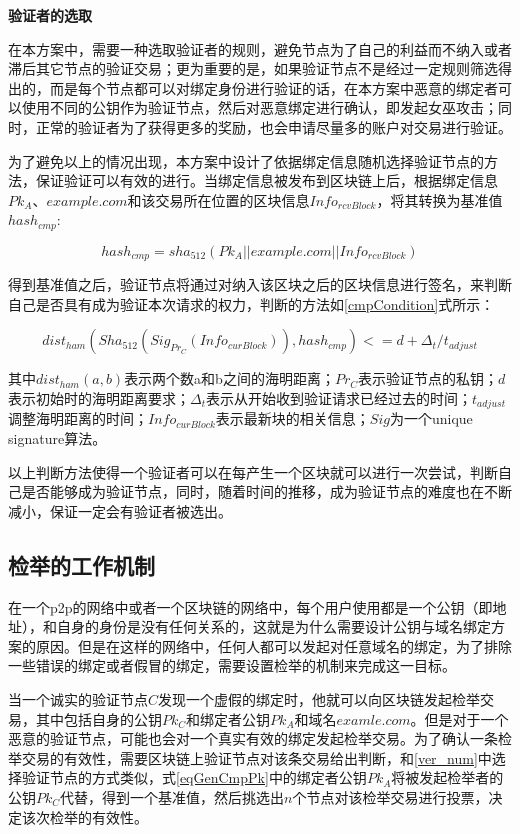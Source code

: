\noindent\textbf{验证者的选取}

在本方案中，需要一种选取验证者的规则，避免节点为了自己的利益而不纳入或者滞后其它节点的验证交易；更为重要的是，如果验证节点不是经过一定规则筛选得出的，而是每个节点都可以对绑定身份进行验证的话，在本方案中恶意的绑定者可以使用不同的公钥作为验证节点，然后对恶意绑定进行确认，即发起女巫攻击；同时，正常的验证者为了获得更多的奖励，也会申请尽量多的账户对交易进行验证。

为了避免以上的情况出现，本方案中设计了依据绑定信息随机选择验证节点的方法，保证验证可以有效的进行。当绑定信息被发布到区块链上后，根据绑定信息$Pk_A$、$example.com$和该交易所在位置的区块信息$Info_{rcvBlock}$，将其转换为基准值$hash_{cmp}$:

\begin{equation}\label{eqGenCmpPk}
hash_{cmp} = sha_{512}(Pk_A||example.com||Info_{rcvBlock})
\end{equation}

得到基准值之后，验证节点将通过对纳入该区块之后的区块信息进行签名，来判断自己是否具有成为验证本次请求的权力，判断的方法如\ref{cmpCondition}式所示：


\begin{equation}\label{cmpCondition}
dist_{ham}(Sha_{512}(Sig_{Pr_C}(Info_{curBlock})), hash_{cmp}) <= d + \Delta_t / t_{adjust}
\end{equation}

其中$dist_{ham}(a,b)$表示两个数a和b之间的海明距离；$Pr_C$表示验证节点的私钥；$d$表示初始时的海明距离要求；$\Delta_t$表示从开始收到验证请求已经过去的时间；$t_{adjust}$调整海明距离的时间；$Info_{curBlock}$表示最新块的相关信息；$Sig$为一个unique signature算法。

以上判断方法使得一个验证者可以在每产生一个区块就可以进行一次尝试，判断自己是否能够成为验证节点，同时，随着时间的推移，成为验证节点的难度也在不断减小，保证一定会有验证者被选出。



\subsection{检举的工作机制}

在一个p2p的网络中或者一个区块链的网络中，每个用户使用都是一个公钥（即地址），和自身的身份是没有任何关系的，这就是为什么需要设计公钥与域名绑定方案的原因。但是在这样的网络中，任何人都可以发起对任意域名的绑定，为了排除一些错误的绑定或者假冒的绑定，需要设置检举的机制来完成这一目标。

当一个诚实的验证节点$C$发现一个虚假的绑定时，他就可以向区块链发起检举交易，其中包括自身的公钥$Pk_C$和绑定者公钥$Pk_A$和域名$examle.com$。但是对于一个恶意的验证节点，可能也会对一个真实有效的绑定发起检举交易。为了确认一条检举交易的有效性，需要区块链上验证节点对该条交易给出判断，和\ref{ver_num}中选择验证节点的方式类似，式\ref{eqGenCmpPk}中的绑定者公钥$Pk_A$将被发起检举者的公钥$Pk_C$代替，得到一个基准值，然后挑选出$n$个节点对该检举交易进行投票，决定该次检举的有效性。


